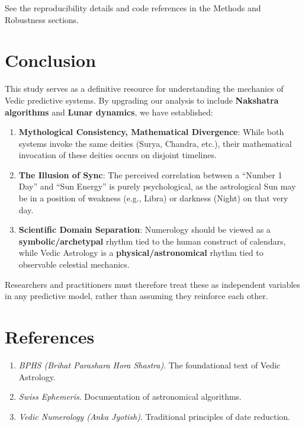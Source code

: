 \documentclass[
  11pt,
  a4paper,
  oneside,
  openany]{article}
\providecommand{\tightlist}{%
  \setlength{\itemsep}{0pt}\setlength{\parskip}{0pt}}\usepackage{longtable,booktabs,array}
\begin{document}
See the reproducibility details and code references in the Methods and
Robustness sections.

\section{Conclusion}\label{conclusion}

This study serves as a definitive resource for understanding the
mechanics of Vedic predictive systems. By upgrading our analysis to
include \textbf{Nakshatra algorithms} and \textbf{Lunar dynamics}, we
have established:

\begin{enumerate}
\def\labelenumi{\arabic{enumi}.}
\tightlist
\item
  \textbf{Mythological Consistency, Mathematical Divergence}: While both
  systems invoke the same deities (Surya, Chandra, etc.), their
  mathematical invocation of these deities occurs on disjoint timelines.
\item
  \textbf{The Illusion of Sync}: The perceived correlation between a
  ``Number 1 Day'' and ``Sun Energy'' is purely psychological, as the
  astrological Sun may be in a position of weakness (e.g., Libra) or
  darkness (Night) on that very day.
\item
  \textbf{Scientific Domain Separation}: Numerology should be viewed as
  a \textbf{symbolic/archetypal} rhythm tied to the human construct of
  calendars, while Vedic Astrology is a \textbf{physical/astronomical}
  rhythm tied to observable celestial mechanics.
\end{enumerate}

Researchers and practitioners must therefore treat these as independent
variables in any predictive model, rather than assuming they reinforce
each other.

\section{References}\label{references}

\begin{enumerate}
\def\labelenumi{\arabic{enumi}.}
\tightlist
\item
  \emph{BPHS (Brihat Parashara Hora Shastra)}. The foundational text of
  Vedic Astrology.
\item
  \emph{Swiss Ephemeris}. Documentation of astronomical algorithms.
\item
  \emph{Vedic Numerology (Anka Jyotish)}. Traditional principles of date
  reduction.
\end{enumerate}
\end{document}
